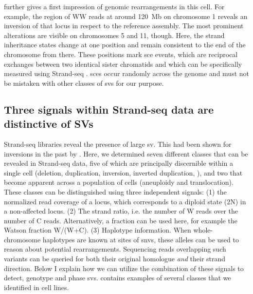  further gives a first impression of genomic rearrangements
in this cell. For example, the region of WW reads at around 120~Mb on chromosome
1 reveals an inversion of that locus in respect to the reference assembly. The
most prominent alterations are visible on chromosomes 5 and 11, though. Here,
the strand inheritance states change at one position and remain consistent to
the end of the chromosome from there. These positions mark \acf{sce} events,
which are reciprocal exchanges between two identical sister chromatids and
which can be specifically measured using Strand-seq \citep{Falconer2012}.
\Acp{sce} occur randomly across the genome and must not be mistaken with other
classes of \acp{sv} for our purpose.





\subsection{Three signals within Strand-seq data are distinctive of SVs}
\label{sec:mosaic_concept}

Strand-seq libraries reveal the presence of large \Acl{sv}. This had been shown
for inversions in the past by \cite{Sanders2016}. Here, we determined seven
different \sv classes that can be revealed in Strand-seq data, five of which are
principally discernible within a single cell (deletion, duplication, inversion,
inverted duplication, \loh), and two that become apparent across a population of
cells (aneuploidy and translocation). These \sv classes can be distinguished
using three independent signals: (1) the normalized read coverage of a locus,
which corresponds to a diploid state (2N) in a non-affected locus.
(2) The strand ratio, i.e. the number of W reads over the number of C reads.
Alternatively, a fraction can be used here, for example the Watson fraction
W/(W+C). (3) Haplotype information. When whole-chromosome haplotypes are known
at sites of \acp{snv}, these alleles can be used to reason about potential
rearrangements. Sequencing reads overlapping such variants can be queried for
both their original homologue \emph{and} their strand direction.
Below I explain how we can utilize the combination of these signals to detect,
genotype and phase \acp{sv}.  contains examples of
several \sv classes that we identified in \rpe cell lines.

